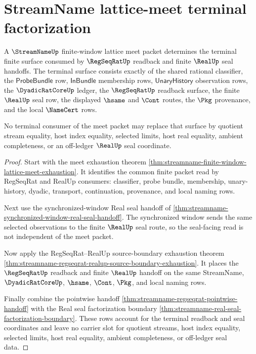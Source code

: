 \section{StreamName lattice-meet terminal factorization}
\label{sec:streamname-lattice-meet-terminal-factorization}

\begin{theorem}
\label{thm:streamname-lattice-meet-terminal-factorization}
A $\StreamNameUp$ finite-window lattice meet packet determines the terminal finite surface consumed by $\RegSeqRatUp$ readback and finite $\RealUp$ seal handoffs. The terminal surface consists exactly of the shared rational classifier, the $\mathsf{ProbeBundle}$ row, $\mathsf{InBundle}$ membership rows, $\mathsf{UnaryHistory}$ observation rows, the $\DyadicRatCoreUp$ ledger, the $\RegSeqRatUp$ readback surface, the finite $\RealUp$ seal row, the displayed $\hsame$ and $\Cont$ routes, the $\Pkg$ provenance, and the local $\NameCert$ rows.

No terminal consumer of the meet packet may replace that surface by quotient stream equality, host index equality, selected limits, host real equality, ambient completeness, or an off-ledger $\RealUp$ seal coordinate.
\end{theorem}
\begin{proof}
Start with the meet exhaustion theorem \autoref{thm:streamname-finite-window-lattice-meet-exhaustion}. It identifies the common finite packet read by RegSeqRat and RealUp consumers: classifier, probe bundle, membership, unary-history, dyadic, transport, continuation, provenance, and local naming rows.

Next use the synchronized-window Real seal handoff of \autoref{thm:streamname-synchronized-window-real-seal-handoff}. The synchronized window sends the same selected observations to the finite $\RealUp$ seal route, so the seal-facing read is not independent of the meet packet.

Now apply the RegSeqRat--RealUp source-boundary exhaustion theorem \autoref{thm:streamname-regseqrat-realup-source-boundary-exhaustion}. It places the $\RegSeqRatUp$ readback and finite $\RealUp$ handoff on the same StreamName, $\DyadicRatCoreUp$, $\hsame$, $\Cont$, $\Pkg$, and local naming rows.

Finally combine the pointwise handoff \autoref{thm:streamname-regseqrat-pointwise-handoff} with the Real seal factorization boundary \autoref{thm:streamname-real-seal-factorization-boundary}. These rows account for the terminal readback and seal coordinates and leave no carrier slot for quotient streams, host index equality, selected limits, host real equality, ambient completeness, or off-ledger seal data.
\end{proof}

